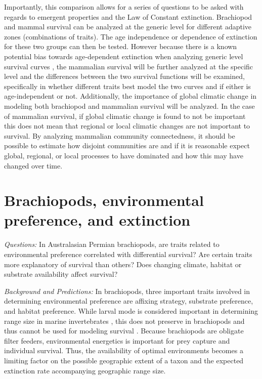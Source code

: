 \documentclass[12pt,letterpaper]{article}
\begin{document}
Importantly, this comparison allows for a series of questions to be asked with regards to emergent properties and the Law of Constant extinction. Brachiopod and mammal survival can be analyzed at the generic level for different adaptive zones (combinations of traits). The age independence or dependence of extinction for these two groups can then be tested. However because there is a known potential bias towards age-dependent extinction when analyzing generic level survival curves \citep{Simpson2006,Raup1978,Raup1991a}, the mammalian survival will be further analyzed at the specific level and the differences between the two survival functions will be examined, specifically in whether different traits best model the two curves and if either is age-independent or not. Additionally, the importance of global climatic change in modeling both brachiopod and  mammalian survival will be analyzed. In the case of mammalian survival, if global climatic change is found to not be important this does not mean that regional or local climatic changes are not important to survival. By analyzing mammalian community connectedness, it should be possible to estimate how disjoint communities are and if it is reasonable expect global, regional, or local processes to have dominated and how this may have changed over time.


\section{Brachiopods, environmental preference, and extinction}

\textit{Questions:} In Australasian Permian brachiopods, are traits related to environmental preference correlated with differential survival? Are certain traits more explanatory of survival than others? Does changing climate, habitat or substrate availability affect survival?

\textit{Background and Predictions:}
In brachiopods, three important traits involved in determining environmental preference are affixing strategy, substrate preference, and habitat preference. While larval mode is considered important in determining range size in marine invertebrates \citep{Jablonski2006a,Jablonski1983}, this does not preserve in brachiopods and thus cannot be used for modeling survival \citep{Jablonski1983}. Because brachiopods are obligate filter feeders, environmental energetics is important for prey capture and individual survival. Thus, the availability of optimal environments becomes a limiting factor on the possible geographic extent of a taxon and the expected extinction rate accompanying geographic range size. 
\end{document}
